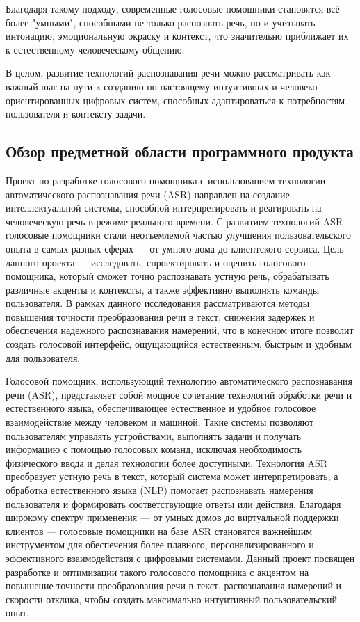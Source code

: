 Благодаря такому подходу, современные голосовые помощники становятся всё более "умными", способными не только распознать речь, но и учитывать интонацию, эмоциональную окраску и контекст, что значительно приближает их к естественному человеческому общению.

В целом, развитие технологий распознавания речи можно рассматривать как важный шаг на пути к созданию по-настоящему интуитивных и человеко-ориентированных цифровых систем, способных адаптироваться к потребностям пользователя и контексту задачи.

\subsection{Обзор предметной области программного продукта}

Проект по разработке голосового помощника с использованием технологии автоматического распознавания речи (ASR) направлен на создание интеллектуальной системы, способной интерпретировать и реагировать на человеческую речь в режиме реального времени. С развитием технологий ASR голосовые помощники стали неотъемлемой частью улучшения пользовательского опыта в самых разных сферах — от умного дома до клиентского сервиса. Цель данного проекта — исследовать, спроектировать и оценить голосового помощника, который сможет точно распознавать устную речь, обрабатывать различные акценты и контексты, а также эффективно выполнять команды пользователя. В рамках данного исследования рассматриваются методы повышения точности преобразования речи в текст, снижения задержек и обеспечения надежного распознавания намерений, что в конечном итоге позволит создать голосовой интерфейс, ощущающийся естественным, быстрым и удобным для пользователя.

Голосовой помощник, использующий технологию автоматического распознавания речи (ASR), представляет собой мощное сочетание технологий обработки речи и естественного языка, обеспечивающее естественное и удобное голосовое взаимодействие между человеком и машиной. Такие системы позволяют пользователям управлять устройствами, выполнять задачи и получать информацию с помощью голосовых команд, исключая необходимость физического ввода и делая технологии более доступными. Технология ASR преобразует устную речь в текст, который система может интерпретировать, а обработка естественного языка (NLP) помогает распознавать намерения пользователя и формировать соответствующие ответы или действия. Благодаря широкому спектру применения — от умных домов до виртуальной поддержки клиентов — голосовые помощники на базе ASR становятся важнейшим инструментом для обеспечения более плавного, персонализированного и эффективного взаимодействия с цифровыми системами. Данный проект посвящен разработке и оптимизации такого голосового помощника с акцентом на повышение точности преобразования речи в текст, распознавания намерений и скорости отклика, чтобы создать максимально интуитивный пользовательский опыт.


